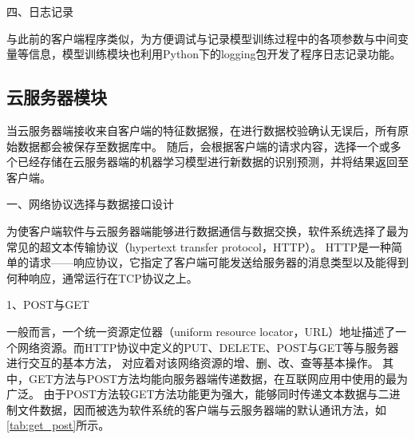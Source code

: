 四、日志记录

与此前的客户端程序类似，为方便调试与记录模型训练过程中的各项参数与中间变量等信息，模型训练模块也利用Python下的logging包\cite{logging}开发了程序日志记录功能。


\subsection{云服务器模块}
当云服务器端接收来自客户端的特征数据猴，在进行数据校验确认无误后，所有原始数据都会被保存至数据库中。
随后，会根据客户端的请求内容，选择一个或多个已经存储在云服务器端的机器学习模型进行新数据的识别预测，并将结果返回至客户端。


一、网络协议选择与数据接口设计

为使客户端软件与云服务器端能够进行数据通信与数据交换，软件系统选择了最为常见的超文本传输协议（hypertext transfer protocol，HTTP）\cite{http}。
HTTP是一种简单的请求——响应协议，它指定了客户端可能发送给服务器的消息类型以及能得到何种响应，通常运行在TCP协议之上。

1、POST与GET

一般而言，一个统一资源定位器（uniform resource locator，URL）地址描述了一个网络资源。而HTTP协议中定义的PUT、DELETE、POST与GET等与服务器进行交互的基本方法，
对应着对该网络资源的增、删、改、查等基本操作\cite{http}。
其中，GET方法与POST方法均能向服务器端传递数据，在互联网应用中使用的最为广泛。
由于POST方法较GET方法功能更为强大，能够同时传递文本数据与二进制文件数据，因而被选为软件系统的客户端与云服务器端的默认通讯方法，如\autoref{tab:get_post}所示。

